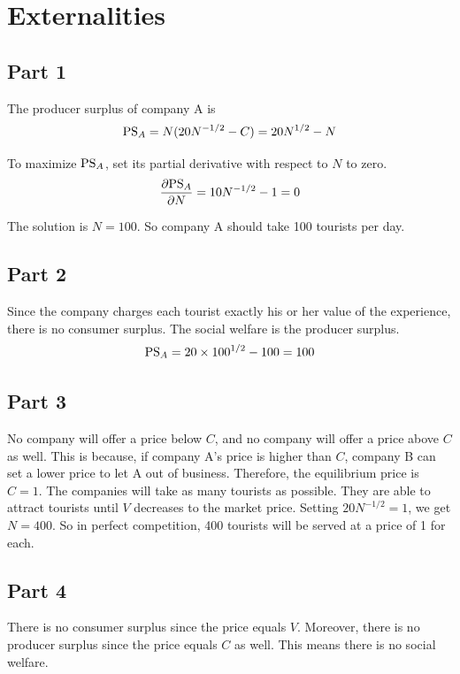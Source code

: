\documentclass{article}
\begin{document}
\section{Externalities}
\subsection{Part 1}
The producer surplus of company A is
\begin{equation*}
\textup{PS}_A=N(20N^{-1/2}-C)=20N^{1/2}-N
\end{equation*}

To maximize $\textup{PS}_A$, set its partial derivative with respect to $N$ to zero.
\begin{equation*}
\frac{\partial\textup{PS}_A}{\partial N}=10N^{-1/2}-1=0
\end{equation*}

The solution is $N=100$. So company A should take 100 tourists per day.

\subsection{Part 2}
Since the company charges each tourist exactly his or her value of the experience, there is no consumer surplus. The social welfare is the producer surplus.
\begin{equation*}
\textup{PS}_A=20\times 100^{1/2}-100=100
\end{equation*}

\subsection{Part 3}
No company will offer a price below $C$, and no company will offer a price above $C$ as well. This is because, if company A's price is higher than $C$, company B can set a lower price to let A out of business. Therefore, the equilibrium price is $C=1$. The companies will take as many tourists as possible. They are able to attract tourists until $V$ decreases to the market price. Setting $20N^{-1/2}=1$, we get $N=400$. So in perfect competition, 400 tourists will be served at a price of 1 for each.

\subsection{Part 4}
There is no consumer surplus since the price equals $V$. Moreover, there is no producer surplus since the price equals $C$ as well. This means there is no social welfare.
\end{document}
